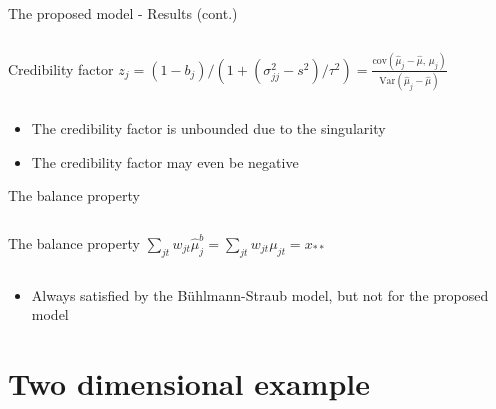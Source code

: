 \documentclass{beamer}
\begin{document}
\begin{frame}{The proposed model - Results (cont.)}
\begin{columns}
        \begin{block}{Credibility factor}
        $z_j = (1-b_j)/(1 + (\sigma_{jj}^2 - s^2)/\tau^2) = \frac{\text{cov}(\hat\mu_j - \hat\mu,\, \mu_j)}{\text{Var}(\hat\mu_j - \hat\mu)}$
    \end{block}
\end{columns}

\vspace{0.5cm}

\begin{itemize}
    \item The credibility factor is unbounded due to the singularity
    \item The credibility factor may even be negative
\end{itemize}
    
\end{frame}

\begin{frame}{The balance property}

\begin{columns}
        \begin{block}{The balance property}
        $\sum_{jt} w_{jt}\hat\mu_j^b = \sum_{jt} w_{jt}\mu_{jt} = x_{\ast\ast}$
    \end{block}
\end{columns}

\vspace{0.5cm}

\begin{itemize}
    \item Always satisfied by the Bühlmann-Straub model, but not for the proposed model
\end{itemize}
    
\end{frame}

\section{Two dimensional example}
\end{document}
